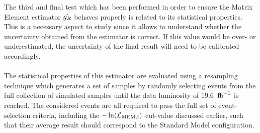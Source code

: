 The third and final test which has been performed in order to ensure the Matrix Element estimator $\hat{g_{R}}$ behaves properly is related to its statistical properties.
This is a necessary aspect to study since it allows to understand whether the uncertainty obtained from the estimator is correct. If this value would be over- or underestimated, the uncertainty of the final result will need to be calibrated accordingly.
\\
\\
The statistical properties of this estimator are evaluated using a resampling technique which generates a set of samples by randomly selecting events from the full collection of simulated samples until the data luminosity of $19.6$ $\, \mathrm{fb}^{-1}$ is reached.
The considered events are all required to pass the full set of event-selection criteria, including the $-\ln(\mathcal{L}_{\textrm{MEM}, i})$ cut-value discussed earlier, such that their average result should correspond to the Standard Model configuration.
\\

